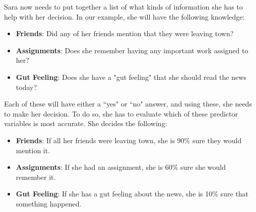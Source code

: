 
Sara now needs to put together a list of what kinds of information she has to help with her decision. In our example, she will have the following knowledge:
\begin{itemize}
\item \textbf{Friends}: Did any of her friends mention that they were leaving town?
\item \textbf{Assignments}: Does she remember having any important work assigned to her?
\item \textbf{Gut Feeling}: Does she have a "gut feeling" that she should read the news today?
\end{itemize}
Each of these will have either a ``yes" or ``no" answer, and using these, she needs to make her decision. To do so, she has to evaluate which of these predictor variables is most accurate. She decides the following:
\begin{itemize}
\item \textbf{Friends}: If all her friends were leaving town, she is 90\% sure they would mention it.
\item \textbf{Assignments}: If she had an assignment, she is 60\% sure she would remember it.
\item \textbf{Gut Feeling}: If she has a gut feeling about the news, she is 10\% sure that something happened.
\end{itemize}

 \vspace{0.2cm}































